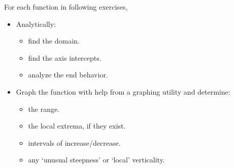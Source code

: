 \documentclass{ximera}
\begin{document}
For each function in following exercises,

\begin{itemize}

\item Analytically:

\begin{multicols}{3}

\begin{itemize}

\item find the domain.

\item find the axis intercepts.

\item analyze the end behavior.

\end{itemize}

\end{multicols}

\item Graph the function with help from a graphing utility and determine:

\begin{multicols}{2}

\begin{itemize}

\item  the range.

\item the local extrema, if they exist.

\end{itemize}

\end{multicols}

\begin{multicols}{2}

\begin{itemize}

\item intervals of increase/decrease.

\item any `unusual steepness' or `local' verticality.

\end{itemize}

\end{multicols}

\begin{multicols}{2}

\begin{itemize}


\end{itemize}
\end{multicols}
\end{itemize}
\end{document}
